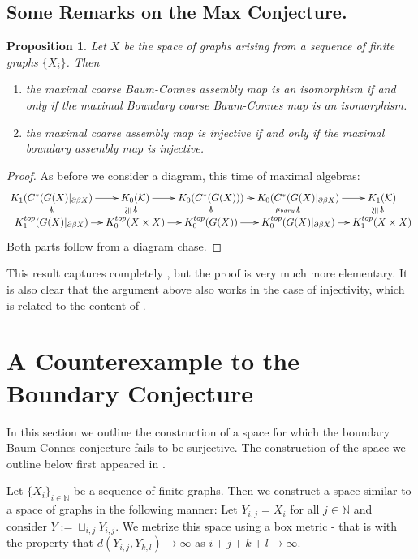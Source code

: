 \documentclass[11pt]{amsart}
\theoremstyle{plain}
\newtheorem{proposition}[theorem]{Proposition}%
\theoremstyle{definition}%
\theoremstyle{remark}%
\newcommand{\ucong}{\rotatebox{90}{$\cong$}}
\begin{document}
\subsection{Some Remarks on the Max Conjecture.}
\begin{proposition}\label{Prop:Max}
Let $X$ be the space of graphs arising from a sequence of finite graphs $\lbrace X_{i} \rbrace$. Then
\begin{enumerate}
\item the maximal coarse Baum-Connes assembly map is an isomorphism if and only if the maximal Boundary coarse Baum-Connes map is an isomorphism.
\item the maximal coarse assembly map is injective if and only if the maximal boundary assembly map is injective.
\end{enumerate}
\end{proposition}
\begin{proof}
As before we consider a diagram, this time of maximal algebras:
\begin{equation*}
\xymatrix@=0.7em{
K_{1}(C^{*}(G(X)|_{\partial\beta X}) \ar[r] & K_{0}(\mathcal{K}) \ar[r]& K_{0}(C^{*}(G(X))) \ar[r]& K_{0}(C^{*}(G(X)|_{\partial\beta X})\ar[r] & K_{1}(\mathcal{K})  \\
K_{1}^{top}(G(X)|_{\partial\beta X}) \ar[r] \ar[u]& K_{0}^{top}(X \times X) \ar[r]\ar[u]^{\ucong}& K_{0}^{top}(G(X)) \ar[r]\ar[u]& K_{0}^{top}(G(X)|_{\partial\beta X}) \ar[r]\ar[u]^{\mu_{bdry}}& K_{1}^{top}(X \times X)\ar[u]^{\ucong}
}
\end{equation*}
Both parts follow from a diagram chase.
\end{proof}

This result captures completely \cite[Corollary 4.18]{MR2568691}, but the proof is very much more elementary. It is also clear that the argument above also works in the case of injectivity, which is related to the content of \cite[Theorem 5.1]{MR2431253}.

\section{A Counterexample to the Boundary Conjecture}\label{Sect:Counter}

In this section we outline the construction of a space for which the boundary Baum-Connes conjecture fails to be surjective. The construction of the space we outline below first appeared in \cite{MR2363697}.

Let $\lbrace X_{i} \rbrace_{i \in \mathbb{N}}$ be a sequence of finite graphs. Then we construct a space similar to a space of graphs in the following manner: Let $Y_{i,j} = X_{i}$ for all $j \in \mathbb{N}$ and consider $Y:= \sqcup_{i,j} Y_{i,j}$. We metrize this space using a box metric - that is with the property that $d(Y_{i,j},Y_{k,l}) \rightarrow \infty$ as $i+j+k+l \rightarrow \infty$. 
\end{document}
